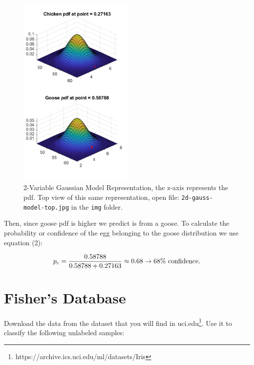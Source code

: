 \documentclass[]{article}
\begin{document}
\begin{figure}[h!]
\centering
\includegraphics[width=0.5\textwidth]{../img/2d-gauss-model}
\caption{2-Variable Gaussian Model Representation, the z-axis represents the pdf. Top view of this same representation, open file: \texttt{2d-gauss-model-top.jpg} in the \texttt{img} folder.}
\end{figure}

Then, since goose pdf is higher we predict is from a goose. To calculate the probability or confidence of the egg belonging to the goose distribution we use equation (2):

$$
p_c = \frac{0.58788}{0.58788 + 0.27163} \approx 0.68 \rightarrow 68\% \text{ confidence}.
\pagebreak
$$
\section{Fisher's Database}

Download the data from the dataset that you will find in uci.edu\footnote{https://archive.ics.uci.edu/ml/datasets/Iris}. Use it to classify the following unlabeled samples:

\end{document}
